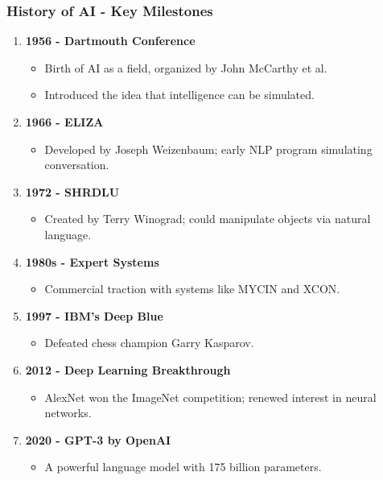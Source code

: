 \documentclass[aspectratio=169]{beamer}
\begin{document}
\begin{frame}[fragile]
    \frametitle{History of AI - Key Milestones}
    \begin{enumerate}
        \item \textbf{1956 - Dartmouth Conference} 
        \begin{itemize}
            \item Birth of AI as a field, organized by John McCarthy et al.
            \item Introduced the idea that intelligence can be simulated.
        \end{itemize}
        
        \item \textbf{1966 - ELIZA}
        \begin{itemize}
            \item Developed by Joseph Weizenbaum; early NLP program simulating conversation.
        \end{itemize}

        \item \textbf{1972 - SHRDLU}
        \begin{itemize}
            \item Created by Terry Winograd; could manipulate objects via natural language.
        \end{itemize}

        \item \textbf{1980s - Expert Systems}
        \begin{itemize}
            \item Commercial traction with systems like MYCIN and XCON.
        \end{itemize}

        \item \textbf{1997 - IBM's Deep Blue}
        \begin{itemize}
            \item Defeated chess champion Garry Kasparov.
        \end{itemize}
        
        \item \textbf{2012 - Deep Learning Breakthrough}
        \begin{itemize}
            \item AlexNet won the ImageNet competition; renewed interest in neural networks.
        \end{itemize}

        \item \textbf{2020 - GPT-3 by OpenAI}
        \begin{itemize}
            \item A powerful language model with 175 billion parameters.
        \end{itemize}
    \end{enumerate}
\end{frame}
\end{document}
